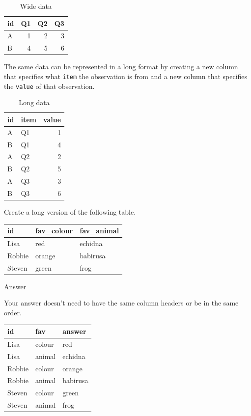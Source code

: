 \documentclass[
  oneside]{book}
\begin{document}
\begin{table}

\caption{\label{tab:wide-data}Wide data}
\centering
\begin{tabular}[t]{l|r|r|r}
\hline
id & Q1 & Q2 & Q3\\
\hline
A & 1 & 2 & 3\\
\hline
B & 4 & 5 & 6\\
\hline
\end{tabular}
\end{table}

The same data can be represented in a long format by creating a new column that specifies what \texttt{item} the observation is from and a new column that specifies the \texttt{value} of that observation.

\begin{table}

\caption{\label{tab:long-data}Long data}
\centering
\begin{tabular}[t]{l|l|r}
\hline
id & item & value\\
\hline
A & Q1 & 1\\
\hline
B & Q1 & 4\\
\hline
A & Q2 & 2\\
\hline
B & Q2 & 5\\
\hline
A & Q3 & 3\\
\hline
B & Q3 & 6\\
\hline
\end{tabular}
\end{table}

\begin{try}

Create a long version of the following table.

\begin{longtable}[]{@{}lll@{}}
\toprule
id & fav\_colour & fav\_animal \\
\midrule
\endhead
Lisa & red & echidna \\
Robbie & orange & babirusa \\
Steven & green & frog \\
\bottomrule
\end{longtable}

Answer

Your answer doesn't need to have the same column headers or be in the same order.

\begin{longtable}[]{@{}lll@{}}
\toprule
id & fav & answer \\
\midrule
\endhead
Lisa & colour & red \\
Lisa & animal & echidna \\
Robbie & colour & orange \\
Robbie & animal & babirusa \\
Steven & colour & green \\
Steven & animal & frog \\
\bottomrule
\end{longtable}

\end{try}
\end{document}
